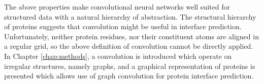 The above properties make convolutional neural networks well suited for structured data with a natural hierarchy of abstraction.
The structural hierarchy of proteins suggests that convolution might be useful in interface prediction.
Unfortunately, neither protein residues, nor their constituent atoms are aligned in a regular grid, so the above definition of convolution cannot be directly applied. 
In Chapter \ref{chap:methods}, a convolution is introduced which operate on irregular structures, namely graphs, and a graphical representation of proteins is presented which allows use of graph convolution for protein interface prediction.